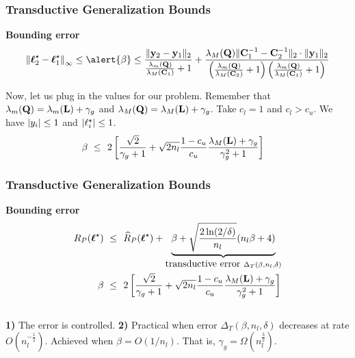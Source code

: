 \documentclass{beamer}
\begin{document}
\begin{frame}
\frametitle{Transductive Generalization Bounds}
\textbf{Bounding  error} 
\[
 \norminf{\bell_2^\star - \bell_1^\star} 
\leq  \alert{\beta} \leq \frac{\normtwo{\by_2 - \by_1}}{\frac{\lambda_m(\bQ)}{\lambda_M(\bC_1)} + 1}
 + \frac{\lambda_M(\bQ) \normtwo{\bC_1^{-1}-\bC_2^{-1}
}  \cdot \normtwo{\by_1}}{\left( \frac{\lambda_m(\bQ)}{\lambda_M(\bC_2)} + 1 \right)
\left(  \frac{\lambda_m(\bQ)}{\lambda_M(\bC_1)} + 1  \right)}
\]

\pause
Now, let us plug in the values for our problem.
\pause
\moveb
Remember that
$\lambda_m(\mathbf{Q}) = \lambda_m(\mathbf{L}) + \gamma_g$
and 
$\lambda_M(\mathbf{Q}) = \lambda_M(\mathbf{L}) + \gamma_g$.
\pause
Take $c_l = 1$ \pause and $c_l > c_u$.
\pause
We have $\left|y_i\right| \leq 1$ \pause and $\left|\ell_i^\star\right| \leq 1$. \pause
\begin{align*}  
  \beta \ \leq & \ \
  2 \left[\frac{\sqrt{2}}{\gamma_g + 1} +
  \sqrt{2 n_l} \frac{1 - c_u}{c_u}
  \frac{\lambda_M(\mathbf{L}) + \gamma_g}{\gamma_g^2 + 1}\right]
\end{align*}
\pause
{}

\end{frame}
\begin{frame}
\frametitle{Transductive Generalization Bounds}
\textbf{Bounding  error} 
\begin{align*}
  R_P(\boldsymbol \ell^\star) \ \leq & \ \
  \widehat{R}_P(\boldsymbol \ell^\star) +
  \underbrace{\beta + \sqrt{\frac{2 \ln(2 / \delta)}{n_l}}
  (n_l \beta + 4)}_{\mbox{transductive error }
  \Delta_T(\beta, n_l, \delta)} \\
  \beta \ \leq & \ \
  2 \left[\frac{\sqrt{2}}{\gamma_g + 1} +
  \sqrt{2 n_l} \frac{1 - c_u}{c_u}
  \frac{\lambda_M(\mathbf{L}) + \gamma_g}{\gamma_g^2 + 1}\right]
\end{align*}
 \\[0.5em]
\pause
\textbf{1)} The error is controlled.
\pause \moveb
\textbf{2)} Practical when error $\Delta_T(\beta, n_l, \delta)$ decreases at rate $O(n_l^{- \frac{1}{2}})$. 
\pause
Achieved when $\beta \! = \! O(1 / n_l)$.
\pause
That is, $\gamma_g \! = \! \Omega(n_l^\frac{3}{2})$.
\pause
{}

\end{frame}


\MakeLastSlide
\end{document}
